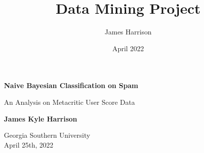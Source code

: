 \documentclass{article}
\title{Data Mining Project}
\author{James Harrison}
\date{April 2022}
\begin{document}
\begin{titlepage}
   \begin{center}
       \vspace*{1cm}

       \textbf{Naive Bayesian Classification on Spam}
     
       \vspace{0.5cm}
        An Analysis on Metacritic User Score Data
            
       \vspace{1.5cm}

       \textbf{James Kyle Harrison}

       \vfill
        
            
       \vspace{0.8cm}
     
            
       Georgia Southern University\\
       April 25th, 2022
            
   \end{center}
\end{titlepage}
\end{document}
